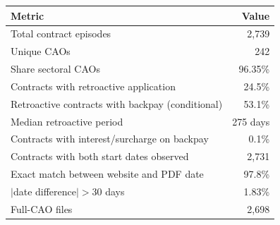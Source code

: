 \begin{tabular}{lr}
    \hline\hline
    Metric & Value \\
    \hline
    Total contract episodes & 2,739 \\
    Unique CAOs & 242 \\
    Share sectoral CAOs & 96.35\% \\
    Contracts with retroactive application & 24.5\% \\
    Retroactive contracts with backpay (conditional) & 53.1\% \\
    Median retroactive period & 275 days \\
    Contracts with interest/surcharge on backpay & 0.1\% \\
    Contracts with both start dates observed & 2,731 \\
    Exact match between website and PDF date & 97.8\% \\
    $|$date difference$|>30$ days & 1.83\% \\
    Full-CAO files & 2,698 \\
    \hline\hline
\end{tabular}
